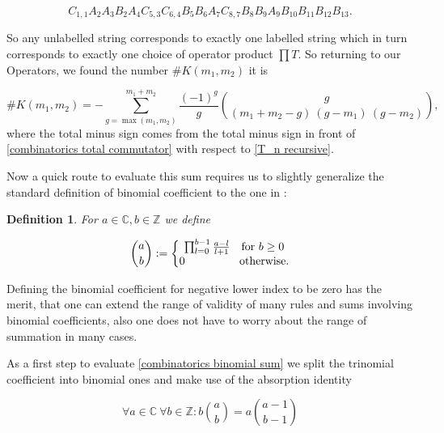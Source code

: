 \documentclass[b5paper,draft,openbib,12pt]{memoir}
\newtheorem{Def}{Definition}[section]
\begin{document}
\begin{equation}
 C_{1,1} A_2 A_3 B_2 A_4 C_{5,3} C_{6,4} B_{5} B_6 A_7 C_{8,7} B_8 B_9 A_9 B_{10} B_{11} B_{12} B_{13}.
\end{equation}

So any unlabelled  string corresponds to exactly one labelled string which in turn corresponds to 
exactly one choice of operator product \(\prod T\). 
So returning to our Operators, we found the number \(\#K(m_1,m_2)\) it is

\begin{equation}\label{combinatorics binomial sum}
\#K(m_1,m_2) =-\sum_{g=\max(m_1,m_2)}^{m_1+m_2} \frac{(-1)^g}{g} \binom{g}{(m_1+m_2-g) \ (g-m_1) \ (g - m_2)},
\end{equation}
where the total minus sign comes from the total minus sign in front of \eqref{combinatorics total commutator}
with respect to \eqref{T_n recursive}. 

Now a quick route to evaluate this sum requires us to slightly generalize the standard definition of
binomial coefficient to the one in \cite{graham1994concrete}:

\begin{Def}
For \(a\in\mathbb{C}, b\in\mathbb{Z}\) we define

\begin{equation}
\binom{a}{b} := \left\{\begin{matrix}
\prod_{l=0}^{b-1} \frac{a-l}{l+1} \quad \text{for } b\ge 0\\
0 \hspace{1.7cm} \text{otherwise.}
\end{matrix}\right.
\end{equation}
\end{Def}

Defining the binomial coefficient for negative lower index to be zero has the merit, that one can extend the
range of validity of many rules and sums involving binomial coefficients, also one does not have 
to worry about the range of summation in many cases.

As a first step to evaluate \eqref{combinatorics binomial sum} we split the trinomial coefficient into binomial
ones and make use of the absorption identity

\begin{equation}\tag{absorption}\label{absorption}
\forall a \in \mathbb{C}\ \forall b \in \mathbb{Z}: b \binom{a}{b} = a \binom{a-1}{b-1} 
\end{equation}
\end{document}
